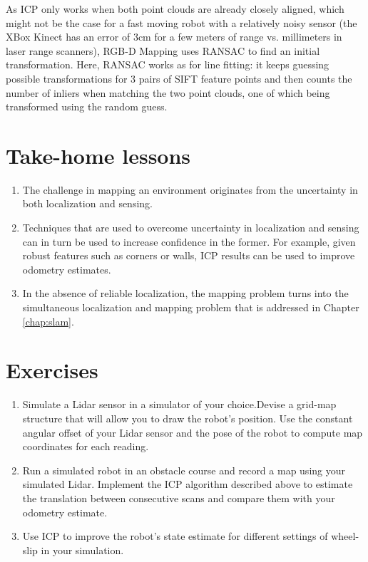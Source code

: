 
As ICP only works when both point clouds are already closely aligned, which might not be the case for a fast moving robot with a relatively noisy sensor (the XBox Kinect has an error of 3cm for a few meters of range vs. millimeters in laser range scanners), RGB-D Mapping uses RANSAC to find an initial transformation. Here, RANSAC works as for line fitting: it keeps guessing possible transformations for 3 pairs of SIFT feature points and then counts the number of inliers when matching the two point clouds, one of which being transformed using the random guess.


\section*{Take-home lessons}
\begin{enumerate}
\item The challenge in mapping an environment originates from the uncertainty in both localization and sensing.
\item Techniques that are used to overcome uncertainty in localization and sensing can in turn be used to increase confidence in the former. For example, given robust features such as corners or walls, ICP results can be used to improve odometry estimates.
\item In the absence of reliable localization, the mapping problem turns into the simultaneous localization and mapping problem that is addressed in Chapter \ref{chap:slam}.
\end{enumerate}

\section*{Exercises}
\begin{enumerate}
\item Simulate a Lidar sensor in a simulator of your choice.Devise a grid-map structure that will allow you to draw the robot's position. Use the constant angular offset of your Lidar sensor and the pose of the robot to compute map coordinates for each reading.
\item Run a simulated robot in an obstacle course and record a map using your simulated Lidar. Implement the ICP algorithm described above to estimate the translation between consecutive scans and compare them with your odometry estimate. 
\item Use ICP to improve the robot's state estimate for different settings of wheel-slip in your simulation.  
\end{enumerate}
